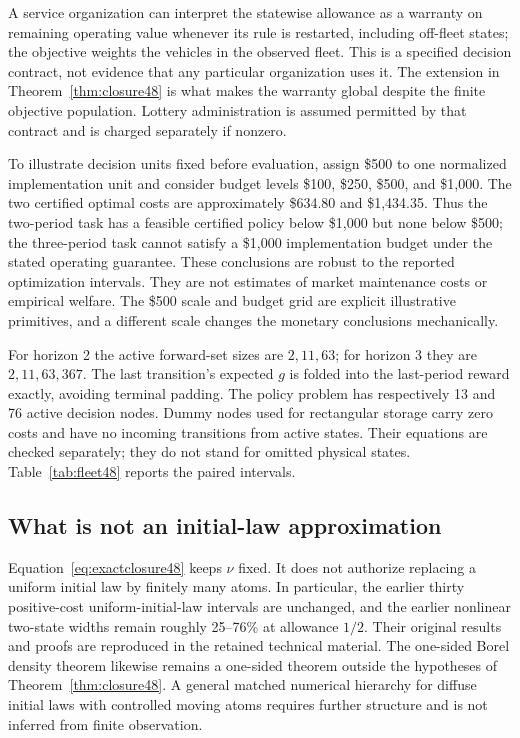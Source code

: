 A service organization can interpret the statewise allowance as a warranty on remaining operating value whenever its rule is restarted, including off-fleet states; the objective weights the vehicles in the observed fleet. This is a specified decision contract, not evidence that any particular organization uses it. The extension in Theorem~\ref{thm:closure48} is what makes the warranty global despite the finite objective population. Lottery administration is assumed permitted by that contract and is charged separately if nonzero.

To illustrate decision units fixed before evaluation, assign \$500 to one normalized implementation unit and consider budget levels \$100, \$250, \$500, and \$1,000. The two certified optimal costs are approximately \$634.80 and \$1,434.35. Thus the two-period task has a feasible certified policy below \$1,000 but none below \$500; the three-period task cannot satisfy a \$1,000 implementation budget under the stated operating guarantee. These conclusions are robust to the reported optimization intervals. They are not estimates of market maintenance costs or empirical welfare. The \$500 scale and budget grid are explicit illustrative primitives, and a different scale changes the monetary conclusions mechanically.

For horizon 2 the active forward-set sizes are $2,11,63$; for horizon 3 they are $2,11,63,367$. The last transition's expected $g$ is folded into the last-period reward exactly, avoiding terminal padding. The policy problem has respectively 13 and 76 active decision nodes. Dummy nodes used for rectangular storage carry zero costs and have no incoming transitions from active states. Their equations are checked separately; they do not stand for omitted physical states. Table~\ref{tab:fleet48} reports the paired intervals.

\subsection{What is not an initial-law approximation}
Equation~\eqref{eq:exactclosure48} keeps $\nu$ fixed. It does not authorize replacing a uniform initial law by finitely many atoms. In particular, the earlier thirty positive-cost uniform-initial-law intervals are unchanged, and the earlier nonlinear two-state widths remain roughly 25--76\% at allowance $1/2$. Their original results and proofs are reproduced in the retained technical material. The one-sided Borel density theorem likewise remains a one-sided theorem outside the hypotheses of Theorem~\ref{thm:closure48}. A general matched numerical hierarchy for diffuse initial laws with controlled moving atoms requires further structure and is not inferred from finite observation.
